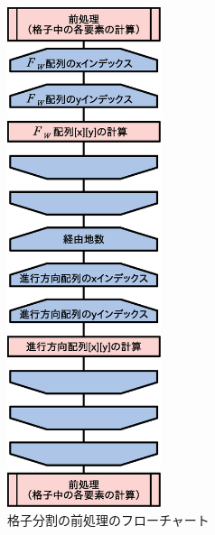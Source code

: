 


\begin{figure}[p]
 \begin{center}
  \includegraphics[width=4.5cm,clip]{figure/5_teian_flow2.eps}
  \caption{格子分割の前処理のフローチャート}
  \label{fig:5_teian_flow2}
 \end{center}
\end{figure}

\clearpage
